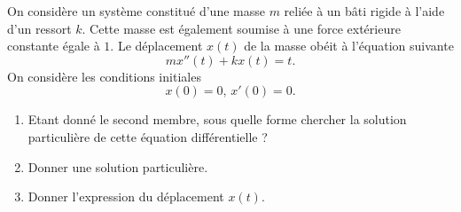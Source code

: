 \bexo
On considère un système constitué d'une masse $m$ reliée à un bâti rigide à l'aide d'un ressort $k$. Cette masse est également soumise à une force extérieure constante égale à $1$. Le déplacement $x(t)$ de la masse obéit à l'équation suivante
\begin{equation}
	mx''(t)+kx(t)=t.
\end{equation}
On considère les conditions initiales
\begin{equation}
	x(0)=0,\, x'(0)=0.
\end{equation}
\begin{enumerate}
	\item Etant donné le second membre, sous quelle forme chercher la solution particulière de cette équation différentielle ?
	\item Donner une solution particulière.
	\item Donner l'expression du déplacement $x(t)$.
\end{enumerate}

\bigskip

\eexo
